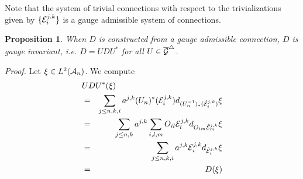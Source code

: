 \documentclass[12pt]{article}
\def\ca{{\cal A}}
\def\ce{{\cal E}}
\def\cf{{\cal F}}
\def\cg{{\cal G}}
\newtheorem{prop}[thm]{Proposition}
\begin{document}
{Note that the system of trivial connections with respect to the trivializations given by $\{\ce_i^{j,k}\}$ is a gauge admissible system of connections. 


\begin{prop} \label{megetgrim}
When $D$ is constructed from a gauge admissible connection,  $D$ is gauge invariant, i.e. $D=UDU^*$ for all $U\in \overline{\cg}^\triangle$.
\end{prop}



\textit{Proof.} %
Let $\xi \in L^2(\ca_n)$. We compute
\begin{eqnarray*}
 \lefteqn{UDU^*(\xi)}\\
&=&\sum_{j\leq n,k,i}a^{j,k}(U_n)^*(\ce_i^{j,k}) d_{(U_n^{-1})_*(\hat{\ce}_i^{j,k})}\xi\\
&=& \sum_{j\leq n,k}a^{j,k}\sum_{i,l,m}O_{il}\ce_l^{j,k} d_{O_{im}\hat{\ce}_m^{j,k}}\xi \\
&=& \sum_{j\leq n,k,i}a^{j,k}\ce_i^{j,k} d_{\hat{\ce}_i^{j,k}}\xi \\
&=& D(\xi)
\end{eqnarray*}

}
\end{document}

